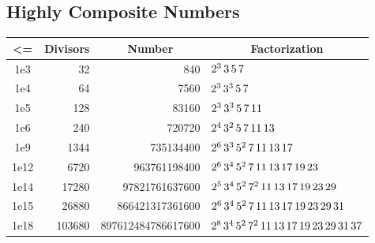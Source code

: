 \subsection{Highly Composite Numbers}

	\begin{center}
		\footnotesize
		\begin{tabular}{|c|r|r|l|}
		\hline
		\textbf{\textless{}=} & \multicolumn{1}{c|}{\textbf{Divisors}} & \multicolumn{1}{c|}{\textbf{Number}} & \multicolumn{1}{c|}{\textbf{Factorization}} \\ \hline
		1e3                 & 32                                     & 840                                  & $ 2^3 \thinspace 3   \thinspace 5   \thinspace 7                                   $ \\ \hline
		1e4                 & 64                                     & 7560                                 & $ 2^3 \thinspace 3^3 \thinspace 5   \thinspace 7                                 $ \\ \hline
		1e5                 & 128                                    & 83160                                & $ 2^3 \thinspace 3^3 \thinspace 5   \thinspace 7   \thinspace 11                              $ \\ \hline
		1e6                 & 240                                    & 720720                               & $ 2^4 \thinspace 3^2 \thinspace 5   \thinspace 7   \thinspace 11 \thinspace 13                           $ \\ \hline
		1e9                 & 1344                                   & 735134400                            & $ 2^6 \thinspace 3^3 \thinspace 5^2 \thinspace 7   \thinspace 11 \thinspace 13 \thinspace 17                      $ \\ \hline
		1e12                & 6720                                   & 963761198400                         & $ 2^6 \thinspace 3^4 \thinspace 5^2 \thinspace 7   \thinspace 11 \thinspace 13 \thinspace 17 \thinspace 19 \thinspace 23                $ \\ \hline
		1e14                & 17280                                  & 97821761637600                       & $ 2^5 \thinspace 3^4 \thinspace 5^2 \thinspace 7^2 \thinspace 11 \thinspace 13 \thinspace 17 \thinspace 19 \thinspace 23 \thinspace 29           $ \\ \hline
		1e15                & 26880                                  & 866421317361600                      & $ 2^6 \thinspace 3^4 \thinspace 5^2 \thinspace 7   \thinspace 11 \thinspace 13 \thinspace 17 \thinspace 19 \thinspace 23 \thinspace 29 \thinspace 31          $ \\ \hline
		1e18                & 103680                                 & 897612484786617600                   & $ 2^8 \thinspace 3^4 \thinspace 5^2 \thinspace 7^2 \thinspace 11 \thinspace 13 \thinspace 17 \thinspace 19 \thinspace 23 \thinspace 29 \thinspace 31 \thinspace 37     $ \\ \hline
		\end{tabular}
	\end{center}

